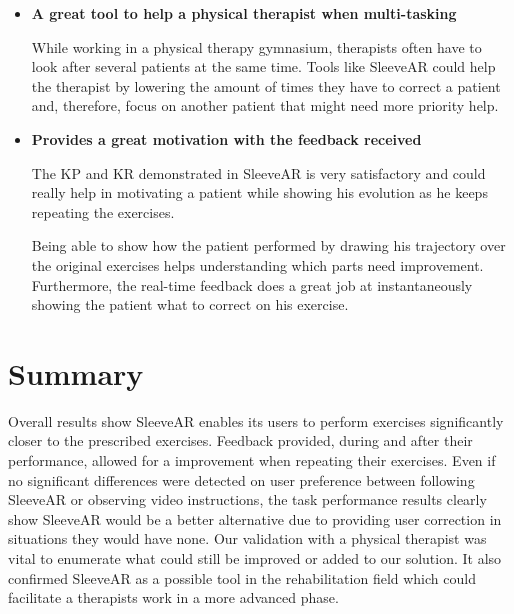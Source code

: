 \begin{itemize}
\item \textbf{A great tool to help a physical therapist when multi-tasking}

While working in a physical therapy gymnasium, therapists often have to look after several patients at the same time. Tools like SleeveAR could help the therapist by lowering the amount of times they have to correct a patient and, therefore, focus on another patient that might need more priority help.


\item \textbf{Provides a great motivation with the feedback received}

The \ac{KP} and \ac{KR} demonstrated in SleeveAR is very satisfactory and could really help in motivating a patient while showing his evolution as he keeps repeating the exercises.

Being able to show how the patient performed by drawing his trajectory over the original exercises helps understanding which parts need improvement. Furthermore, the real-time feedback does a great job at instantaneously showing the patient what to correct on his exercise.

\end{itemize}

\section{Summary}

Overall results show SleeveAR enables its users to perform exercises significantly closer to the prescribed exercises. 
Feedback provided, during and after their performance, allowed for a improvement when repeating their exercises. 
Even if no significant differences were detected on user preference between following SleeveAR or observing video instructions, 
the task performance results clearly show SleeveAR would be a better alternative due to providing user correction in situations they would have none.
Our validation with a physical therapist was vital to enumerate what could still be improved or added to our solution. 
It also confirmed SleeveAR as a possible tool in the rehabilitation field which could facilitate a therapists work in a more advanced phase.
